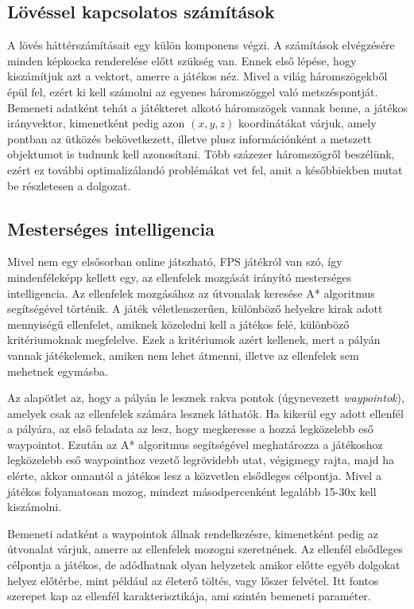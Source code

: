 \subsection{Lövéssel kapcsolatos számítások}

A lövés háttérszámításait egy külön komponens végzi. A számítások elvégzésére minden képkocka renderelése előtt szükség van. Ennek első lépése, hogy kiszámítjuk azt a vektort, amerre a játékos néz. Mivel a világ háromszögekből épül fel, ezért ki kell számolni az egyenes háromszöggel való metszéspontját. Bemeneti adatként tehát a játékteret alkotó háromszögek vannak benne, a játékos irányvektor, kimenetként pedig azon $(x, y, z)$ koordinátákat várjuk, amely pontban az ütközés bekövetkezett, illetve plusz információnként a metszett objektumot is tudnunk kell azonosítani. Több százezer háromszögről beszélünk, ezért ez további optimalizálandó problémákat vet fel, amit a későbbiekben mutat be részletesen a dolgozat.

\subsection{Mesterséges intelligencia}

Mivel nem egy elsősorban online játszható, FPS játékról van szó, így mindenféleképp kellett egy, az ellenfelek mozgását irányító mesterséges intelligencia. Az ellenfelek mozgásához az útvonalak keresése A* algoritmus segítségével történik. A játék véletlenszerűen, különböző helyekre kirak adott mennyiségű ellenfelet, amiknek közeledni kell a játékos felé, különböző kritériumoknak megfelelve. Ezek a kritériumok azért kellenek, mert a pályán vannak játékelemek, amiken nem lehet átmenni, illetve az ellenfelek sem mehetnek egymásba. 

Az alapötlet az, hogy a pályán le lesznek rakva pontok (úgynevezett \textit{waypointok}), amelyek csak az ellenfelek számára lesznek láthatók. Ha kikerül egy adott ellenfél a pályára, az első feladata az lesz, hogy megkeresse a hozzá legközelebb eső waypointot. Ezután az A* algoritmus segítségével meghatározza a játékoshoz legközelebb eső waypointhoz vezető legrövidebb utat, végigmegy rajta, majd ha elérte, akkor onnantól a játékos lesz a közvetlen elsődleges célpontja. Mivel a játékos folyamatosan mozog, mindezt másodpercenként legalább 15-30x kell kiszámolni.

Bemeneti adatként a waypointok állnak rendelkezésre, kimenetként pedig az útvonalat várjuk, amerre az ellenfelek mozogni szeretnének. Az ellenfél elsődleges célpontja a játékos, de adódhatnak olyan helyzetek amikor előtte egyéb dolgokat helyez előtérbe, mint például az életerő töltés, vagy lőszer felvétel. Itt fontos szerepet kap az ellenfél karakterisztikája, ami szintén bemeneti paraméter.

